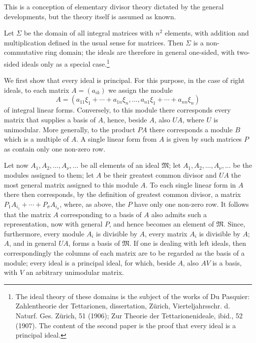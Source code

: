 \documentclass[11pt]{article}
\providecommand{\ideal}[1]{\mathfrak{#1}}
\begin{document}
This is a conception of elementary divisor theory dictated by the general developments, but the theory itself is assumed as known.

Let $\Sigma$ be the domain of all integral matrices with $n^2$ elements, with addition and multiplication defined in the usual sense for matrices. Then $\Sigma$ is a non-commutative ring domain; the ideals are therefore in general one-sided, with two-sided ideals only as a special case.\footnote{The ideal theory of these domains is the subject of the works of Du Pasquier: Zahlentheorie der Tettarionen, dissertation, Zürich, Vierteljahrsschr. d. Naturf. Ges. Zürich, 51 (1906); Zur Theorie der Tettarionenideale, ibid., 52 (1907). The content of the second paper is the proof that every ideal is a principal ideal.}

We first show that every ideal is principal. For this purpose, in the case of right ideals, to each matrix $A=(a_{ik})$ we assign the module
\[
 A=(a_{11}\xi_1+\cdots+a_{1n}\xi_n,
 \ldots,
 a_{n1}\xi_1+\cdots+a_{nn}\xi_n)
\]
of integral linear forms. Conversely, to this module there corresponds every matrix that supplies a basis of $A$, hence, beside $A$, also $UA$, where $U$ is unimodular. More generally, to the product $PA$ there corresponds a module $B$ which is a multiple of $A$. A single linear form from $A$ is given by such matrices $P$ as contain only one non-zero row.

Let now $A_1,A_2,
\ldots,A_\nu,
\ldots$ be all elements of an ideal $\ideal M$; let $A_1,A_2,
\ldots,A_\nu,
\ldots$ be the modules assigned to them; let $A$ be their greatest common divisor and $UA$ the most general matrix assigned to this module $A$. To each single linear form in $A$ there then corresponds, by the definition of greatest common divisor, a matrix $P_1A_{i_1}+\cdots+P_\sigma A_{i_\sigma}$, where, as above, the $P$ have only one non-zero row. It follows that the matrix $A$ corresponding to a basis of $A$ also admits such a representation, now with general $P$, and hence becomes an element of $\ideal M$. Since, furthermore, every module $A_i$ is divisible by $A$, every matrix $A_i$ is divisible by $A$; $A$, and in general $UA$, forms a basis of $\ideal M$. If one is dealing with left ideals, then correspondingly the columns of each matrix are to be regarded as the basis of a module; every ideal is a principal ideal, for which, beside $A$, also $AV$ is a basis, with $V$ an arbitrary unimodular matrix.
\end{document}
